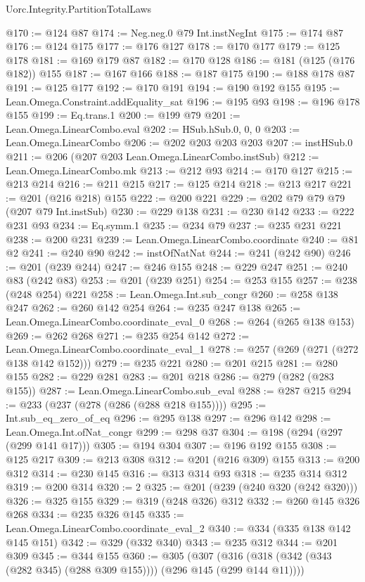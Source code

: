 \begin{lexlean}{Uorc.Integrity.PartitionTotalLaws}
\begin{coremodule}
@170 := @124 @87
@174 := Neg.neg.{0} @79 Int.instNegInt
@175 := @174 @87
@176 := @124 @175
@177 := @176 @127
@178 := @170 @177
@179 := @125 @178
@181 := @169 @179 @87
@182 := @170 @128
@186 := @181 (@125 (@176 @182)) @155
@187 := @167 @166
@188 := @187 @175
@190 := @188 @178 @87
@191 := @125 @177
@192 := @170 @191
@194 := @190 @192 @155
@195 := Lean.Omega.Constraint.addEquality_sat
@196 := @195 @93
@198 := @196 @178 @155
@199 := Eq.trans.{1}
@200 := @199 @79
@201 := Lean.Omega.LinearCombo.eval
@202 := HSub.hSub.{0, 0, 0}
@203 := Lean.Omega.LinearCombo
@206 := @202 @203 @203 @203
@207 := instHSub.{0}
@211 := @206 (@207 @203 Lean.Omega.LinearCombo.instSub)
@212 := Lean.Omega.LinearCombo.mk
@213 := @212 @93
@214 := @170 @127
@215 := @213 @214
@216 := @211 @215
@217 := @125 @214
@218 := @213 @217
@221 := @201 (@216 @218) @155
@222 := @200 @221
@229 := @202 @79 @79 @79 (@207 @79 Int.instSub)
@230 := @229 @138
@231 := @230 @142
@233 := @222 @231 @93
@234 := Eq.symm.{1}
@235 := @234 @79
@237 := @235 @231 @221
@238 := @200 @231
@239 := Lean.Omega.LinearCombo.coordinate
@240 := @81 @2
@241 := @240 @90
@242 := instOfNatNat
@244 := @241 (@242 @90)
@246 := @201 (@239 @244)
@247 := @246 @155
@248 := @229 @247
@251 := @240 @83 (@242 @83)
@253 := @201 (@239 @251)
@254 := @253 @155
@257 := @238 (@248 @254) @221
@258 := Lean.Omega.Int.sub_congr
@260 := @258 @138 @247
@262 := @260 @142 @254
@264 := @235 @247 @138
@265 := Lean.Omega.LinearCombo.coordinate_eval_0
@268 := @264 (@265 @138 @153)
@269 := @262 @268
@271 := @235 @254 @142
@272 := Lean.Omega.LinearCombo.coordinate_eval_1
@278 := @257 (@269 (@271 (@272 @138 @142 @152)))
@279 := @235 @221
@280 := @201 @215
@281 := @280 @155
@282 := @229 @281
@283 := @201 @218
@286 := @279 (@282 (@283 @155))
@287 := Lean.Omega.LinearCombo.sub_eval
@288 := @287 @215
@294 := @233 (@237 (@278 (@286 (@288 @218 @155))))
@295 := Int.sub_eq_zero_of_eq
@296 := @295 @138
@297 := @296 @142
@298 := Lean.Omega.Int.ofNat_congr
@299 := @298 @37
@304 := @198 (@294 (@297 (@299 @141 @17)))
@305 := @194 @304
@307 := @196 @192 @155
@308 := @125 @217
@309 := @213 @308
@312 := @201 (@216 @309) @155
@313 := @200 @312
@314 := @230 @145
@316 := @313 @314 @93
@318 := @235 @314 @312
@319 := @200 @314
@320 := 2
@325 := @201 (@239 (@240 @320 (@242 @320)))
@326 := @325 @155
@329 := @319 (@248 @326) @312
@332 := @260 @145 @326 @268
@334 := @235 @326 @145
@335 := Lean.Omega.LinearCombo.coordinate_eval_2
@340 := @334 (@335 @138 @142 @145 @151)
@342 := @329 (@332 @340)
@343 := @235 @312
@344 := @201 @309
@345 := @344 @155
@360 := @305
    (@307 (@316 (@318 (@342 (@343 (@282 @345) (@288 @309 @155)))) (@296 @145 (@299 @144 @11))))

\end{coremodule}
\end{lexlean}
